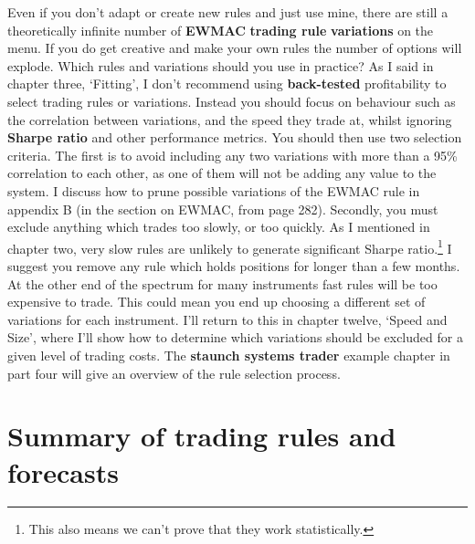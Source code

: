Even if you don't adapt or create new rules and just use mine, there are still a theoretically infinite number of \textbf{EWMAC} \textbf{trading rule} \textbf{variations} on the menu. If you do get creative and make your own rules the number of options will explode. Which rules and variations should you use in practice? As I said in chapter three, ‘Fitting', I don't recommend using \textbf{back-tested} profitability to select trading rules or variations. Instead you should focus on behaviour such as the correlation between variations, and the speed they trade at, whilst ignoring \textbf{Sharpe ratio} and other performance metrics. You should then use two selection criteria. The first is to avoid including any two variations with more than a 95\% correlation to each other, as one of them will not be adding any value to the system. I discuss how to prune possible variations of the EWMAC rule in appendix B (in the section on EWMAC, from page 282). Secondly, you must exclude anything which trades too slowly, or too quickly. As I mentioned in chapter two, very slow rules are unlikely to generate significant Sharpe ratio.\footnote{This also means we can't prove that they work statistically.} I suggest you remove any rule which holds positions for longer than a few months. At the other end of the spectrum for many instruments fast rules will be too expensive to trade. This could mean you end up choosing a different set of variations for each instrument. I'll return to this in chapter twelve, ‘Speed and Size', where I'll show how to determine which variations should be excluded for a given level of trading costs. The \textbf{staunch systems trader} example chapter in part four will give an overview of the rule selection process.

\section*{Summary of trading rules and forecasts}  {}

